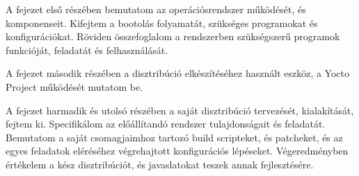 \medskip

A fejezet első részében bemutatom az operációsrendszer működését, és
komponenseit. Kifejtem a bootolás folyamatát, szükséges programokat és
konfigurációkat. Röviden összefoglalom a rendszerben szükségszerű programok
funkcióját, feladatát és felhasználását.

A fejezet második részében a disztribúció elkészítéséhez használt eszköz, a
Yocto Project működését mutatom be.

A fejezet harmadik és utolsó részében a saját disztribúció tervezését,
kialakítását, fejtem ki. Specifikálom az előállítandó rendszer tulajdonságait és
feladatát. Bemutatom a saját csomagjaimhoz tartozó build
scripteket, és patcheket, és az egyes feladatok eléréséhez végrehajtott
konfigurációs lépéseket. Végeredményben értékelem a kész disztribúciót, és
javaslatokat teszek annak fejlesztésére.








